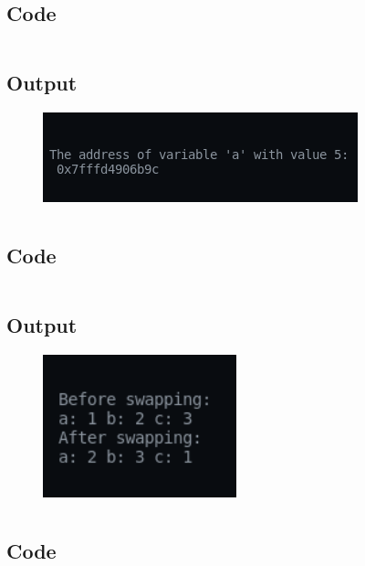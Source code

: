 \documentclass[12pt]{article}
\begin{document}
\newpage
\section{}
\subsection{Code}
\inputminted{c}{q2.c}
\subsection{Output}
\begin{figure}[h]
    \centering
    \includegraphics{2.png}
\end{figure}

\newpage
\section{}
\subsection{Code}
\inputminted{c}{q3.c}
\subsection{Output}
\begin{figure}[h]
    \centering
    \includegraphics[width=0.5\textwidth]{3.png}
\end{figure}

\newpage
\section{}
\subsection{Code}
\inputminted{c}{q4.c}
\end{document}
